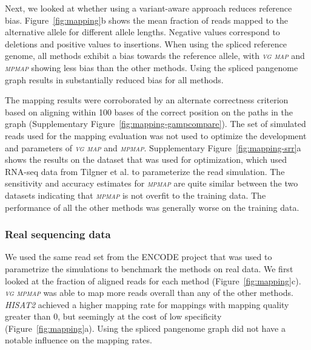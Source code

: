 \documentclass[11pt]{ucthesis}
\newcommand{\tool}[1]{\emph{\textsc{#1}}}
\begin{document}
Next, we looked at whether using a variant-aware approach reduces reference bias. Figure~\ref{fig:mapping}b shows the mean fraction of reads mapped to the alternative allele for different allele lengths. Negative values correspond to deletions and positive values to insertions. When using the spliced reference genome, all methods exhibit a bias towards the reference allele, with \tool{vg map} and \tool{mpmap} showing less bias than the other methods. Using the spliced pangenome graph results in substantially reduced bias for all 
methods.

The mapping results were corroborated by an alternate correctness criterion based on aligning within 100 bases of the correct position on the paths in the graph (Supplementary Figure~\ref{fig:mapping-gampcompare}).
\newline 
\newline
The set of simulated reads used for the mapping evaluation was not used to optimize the development and parameters of \tool{vg map} and \tool{mpmap}. Supplementary Figure~\ref{fig:mapping-srr}a shows the results on the dataset that was used for optimization, which used RNA-seq data from Tilgner et al. \cite{tilgner2014defining} to parameterize the read simulation. The sensitivity and accuracy estimates for \tool{mpmap} are quite similar between the two datasets indicating that \tool{mpmap} is not overfit to the training data. The performance of all the other methods was generally worse on the training data. 

\subsubsection{Real sequencing data}

We used the same read set from the ENCODE project that was used to parametrize the simulations to benchmark the methods on real data. We first looked at the fraction of aligned reads for each method (Figure~\ref{fig:mapping}c). \tool{vg mpmap} was able to map more reads overall than any of the other methods. \tool{HISAT2} achieved a higher mapping rate for mappings with mapping quality greater than 0, but seemingly at the cost of low specificity (Figure~\ref{fig:mapping}a). Using the spliced pangenome graph did not have a notable influence on the mapping rates. 
\end{document}
